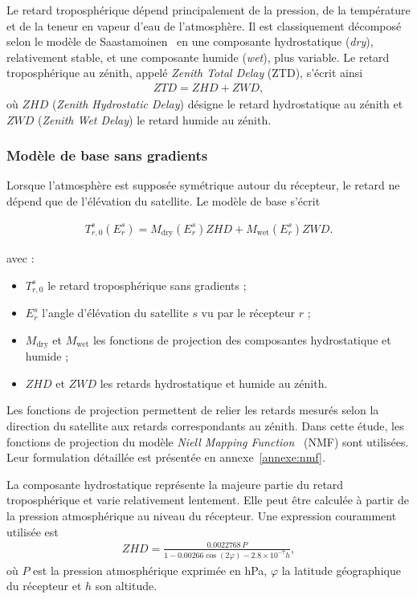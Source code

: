 Le retard troposphérique dépend principalement de la pression, de la
température et de la teneur en vapeur d'eau de l'atmosphère. Il est
classiquement décomposé selon le modèle de Saastamoinen~\cite{saastamoinen1972} en une composante hydrostatique (\textit{dry}),
relativement stable, et une composante humide (\textit{wet}), plus variable.
Le retard troposphérique au zénith, appelé \textit{Zenith Total Delay} (ZTD),
s'écrit ainsi
\begin{align}
ZTD = ZHD + ZWD,
\label{eq:ztd_decomposition}
\end{align}
où $ZHD$ (\textit{Zenith Hydrostatic Delay}) désigne le retard hydrostatique
au zénith et $ZWD$ (\textit{Zenith Wet Delay}) le retard humide au zénith.

\subsubsection{Modèle de base sans gradients}

Lorsque l'atmosphère est supposée symétrique autour du récepteur, le retard ne
dépend que de l'élévation du satellite. Le modèle de base s'écrit

\begin{align}
T_{r,0}^s(E_r^s)
=
M_{\mathrm{dry}}(E_r^s)ZHD
+
M_{\mathrm{wet}}(E_r^s)ZWD.
\label{eq:tropo_no_grad}
\end{align}

avec :

\begin{itemize}
    \item $T_{r,0}^s$ le retard troposphérique sans gradients ;
    \item $E_r^s$ l'angle d'élévation du satellite $s$ vu par le récepteur
    $r$ ;
    \item $M_{\mathrm{dry}}$ et $M_{\mathrm{wet}}$ les fonctions de projection
    des composantes hydrostatique et humide ;
    \item $ZHD$ et $ZWD$ les retards hydrostatique et humide au zénith.
\end{itemize}

Les fonctions de projection permettent de relier les retards mesurés selon
la direction du satellite aux retards correspondants au zénith. Dans cette
étude, les fonctions de projection du modèle \textit{Niell Mapping Function}~\cite{niell1996}
(NMF) sont utilisées. Leur formulation détaillée est présentée en
annexe~\ref{annexe:nmf}.

La composante hydrostatique représente la majeure partie du retard
troposphérique et varie relativement lentement. Elle peut être calculée à
partir de la pression atmosphérique au niveau du récepteur. Une expression
couramment utilisée est
\begin{align}
ZHD
=
\frac{0.0022768\,P}
{1-0.00266\cos(2\varphi)-2.8\times10^{-7}h},
\label{eq:zhd}
\end{align}
où $P$ est la pression atmosphérique exprimée en hPa, $\varphi$ la latitude
géographique du récepteur et $h$ son altitude.

